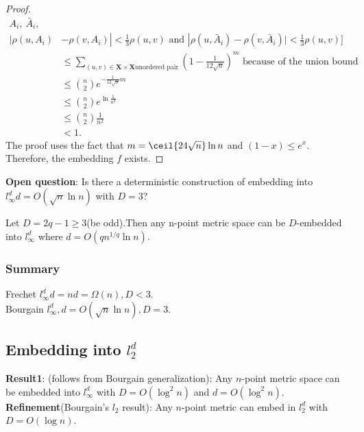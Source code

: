 \begin{proof}
\begin{align*}
  A_i,\ \bar{A}_i,\\|\rho (u,A_i) &- \rho (v, A_i) | < \frac{1}{3}
  \rho (u,v) \textrm{ and } |\rho (u,\bar{A}_i) - \rho (v, \bar{A}_i)
  | < \frac{1}{3} \rho (u,v) \bigg]\\ 
&\leq \sum_{(u,v)\in \mathbf{X}\times \mathbf{X} \textrm{unordered
    pair}} (1-\frac{1}{12\sqrt{n}})^m \textrm{ because of the union
  bound}\\ 
&\leq \binom{n}{2} e^{-\frac{1}{12\sqrt{n}}m}\\
&\leq \binom{n}{2} e^{\ln \frac{1}{n^2}}\\
&\leq \binom{n}{2} \frac{1}{n^2}\\
&<1.
\end{align*}
The proof uses the fact that $m=\ceil{24 \sqrt{n}} \ln n$ and $(1-x)
\leq e^{x}$.\\ 
Therefore, the embedding $f$ exists.


\end{proof}
\textbf{Open question}: Is there a deterministic construction of
embedding into $l_\infty^d d = O(\sqrt{n}\ln n)$ with $D=3$? 

\begin{theorem}
Let $D=2q-1\geq 3$(be odd).Then any n-point metric space can be
$D$-embedded into $l_\infty^d$ where $d=O(q n^{1/q} \ln n)$. 
\end{theorem}

\subsubsection{Summary}
Frechet $l_\infty^d d=n d=\Omega (n),D<3$.\\
Bourgain $l_\infty^d,d=O(\sqrt{n}\ln n),D=3$.\\

\subsection{Embedding into $l_2^d$}
\textbf{Result1}: (follows from Bourgain generalization): Any
$n$-point metric space can be embedded into $l_\infty^d$ with
$D=O(\log^2 n)$ and $d=O(\log^2 n)$.\\  
\textbf{Refinement}(Bourgain's $l_2$ result): Any $n$-point metric can
embed in $l_2^d$ with $D=O(\log n)$.\\ 


